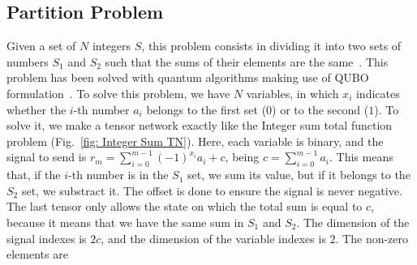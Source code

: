 \subsection{Partition Problem}
Given a set of $N$ integers $S$, this problem consists in dividing it into two sets of numbers $S_1$ and $S_2$ such that the sums of their elements are the same~\cite{Partition}. This problem has been solved with quantum algorithms making use of QUBO formulation~\cite{Partition_Quantum}. To solve this problem, we have $N$ variables, in which $x_i$ indicates whether the $i$-th number $a_i$ belongs to the first set ($0$) or to the second ($1$). To solve it, we make a tensor network exactly like the Integer sum total function problem (Fig.~\ref{fig: Integer Sum TN}). Here, each variable is binary, and the signal to send is $r_m=\sum_{i=0}^{m-1} (-1)^{x_i} a_i  + c$, being $c = \sum_{i=0}^{m-1} a_i$. This means that, if the $i$-th number is in the $S_1$ set, we sum its value, but if it belongs to the $S_2$ set, we substract it. The offset is done to ensure the signal is never negative. The last tensor only allows the state on which the total sum is equal to $c$, because it means that we have the same sum in $S_1$ and $S_2$. The dimension of the signal indexes is $2c$, and the dimension of the variable indexes is $2$. The non-zero elements are


